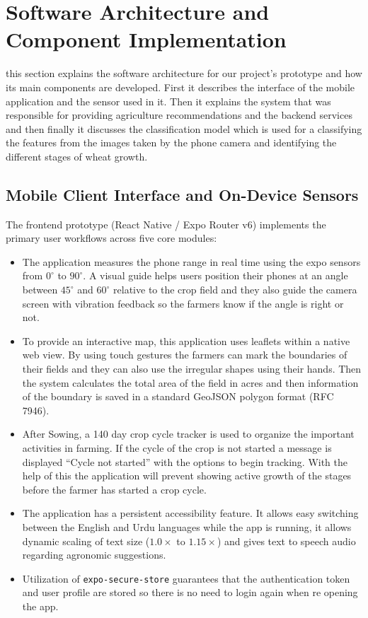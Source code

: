 \documentclass{FastFyp}
\begin{document}
\section{Software Architecture and Component Implementation}
this section explains the software architecture for our project's prototype and how its main components are developed. First it describes the interface of the mobile application and the sensor used in it. Then it explains the system that was responsible for providing agriculture recommendations and the backend services and then finally it discusses the classification model which is used for a classifying the features from the images taken by the phone camera and identifying the different stages of wheat growth.

\subsection{Mobile Client Interface and On-Device Sensors}

The frontend prototype (React Native / Expo Router v6) implements the primary user workflows across five core modules:

\begin{itemize}
	\item The application measures the phone range in real time using the expo sensors from $0^\circ$ to $90^\circ$. A visual guide helps users position their phones at an angle between $45^\circ$ and $60^\circ$ relative to the crop field and they also guide the camera screen with vibration feedback so the farmers know if the angle is right or not.
	
	\item To provide an interactive map, this application uses leaflets within a native web view. By using touch gestures the farmers can mark the boundaries of their fields and they can also use the irregular shapes using their hands. Then the system calculates the total area of the field in acres and then information of the boundary is saved in a standard GeoJSON polygon format (RFC 7946).
	
	\item After Sowing, a 140 day crop cycle tracker is used to organize the important activities in farming. If the cycle of the crop is not started a message is displayed ``Cycle not started'' with the options to begin tracking. With the help of this the application will prevent showing active growth of the stages before the farmer has started a crop cycle.
	
	\item The application has a persistent accessibility feature. It allows easy switching between the English and Urdu languages while the app is running, it allows dynamic scaling of text size ($1.0\times$ to $1.15\times$) and gives text to speech audio regarding agronomic suggestions.
	
	\item Utilization of \texttt{expo-secure-store} guarantees that the authentication token and user profile are stored so there is no need to login again when re opening the app.
\end{itemize}
\end{document}
